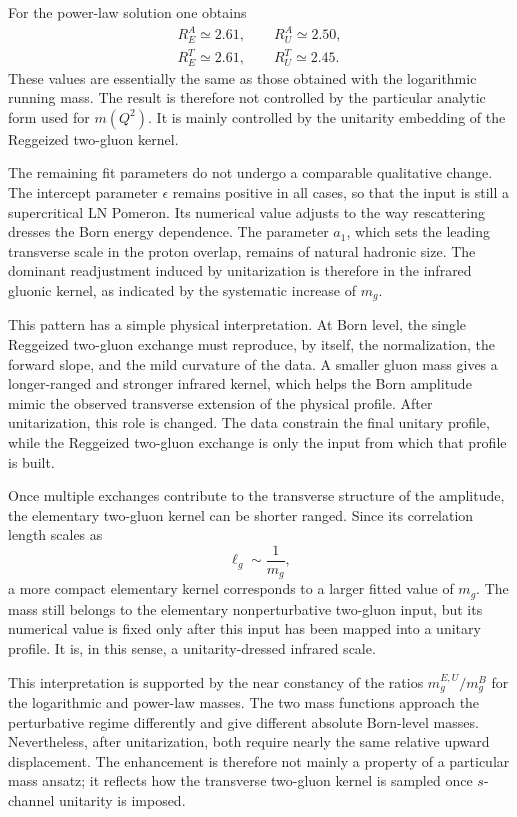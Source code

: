 \documentclass[aps,prd,twocolumn,superscriptaddress,longbibliography,nofootinbib]{revtex4-2}
\begin{document}
For the power-law solution one obtains
\begin{eqnarray}
R_E^A\simeq 2.61,
\qquad
R_U^A\simeq 2.50,\\
R_E^T\simeq 2.61,
\qquad
R_U^T\simeq 2.45.
\end{eqnarray}
These values are essentially the same as those obtained with the
logarithmic running mass. The result is therefore not controlled by the
particular analytic form used for $m(Q^2)$. It is mainly controlled by
the unitarity embedding of the Reggeized two-gluon kernel.



The remaining fit parameters do not undergo a comparable qualitative
change. The intercept parameter $\epsilon$ remains positive in all
cases, so that the input is still a supercritical LN Pomeron. Its
numerical value adjusts to the way rescattering dresses the Born energy
dependence. The parameter $a_1$, which sets the leading transverse scale
in the proton overlap, remains of natural hadronic size. The dominant
readjustment induced by unitarization is therefore in the infrared
gluonic kernel, as indicated by the systematic increase of $m_g$.

This pattern has a simple physical interpretation. At Born level, the
single Reggeized two-gluon exchange must reproduce, by itself, the
normalization, the forward slope, and the mild curvature of the data. A
smaller gluon mass gives a longer-ranged and stronger infrared kernel,
which helps the Born amplitude mimic the observed transverse extension
of the physical profile. After unitarization, this role is changed. The
data constrain the final unitary profile, while the Reggeized two-gluon
exchange is only the input from which that profile is built.

Once multiple exchanges contribute to the transverse structure of the
amplitude, the elementary two-gluon kernel can be shorter ranged. Since
its correlation length scales as
\begin{equation}
\ell_g\sim \frac{1}{m_g},
\label{eq:correlation_length}
\end{equation}
a more compact elementary kernel corresponds to a larger fitted value of
$m_g$. The mass still belongs to the elementary nonperturbative
two-gluon input, but its numerical value is fixed only after this input
has been mapped into a unitary profile. It is, in this sense, a
unitarity-dressed infrared scale.

This interpretation is supported by the near constancy of the ratios
$m_g^{E,U}/m_g^B$ for the logarithmic and power-law masses. The two mass
functions approach the perturbative regime differently and give
different absolute Born-level masses. Nevertheless, after unitarization,
both require nearly the same relative upward displacement. The
enhancement is therefore not mainly a property of a particular mass
ansatz; it reflects how the transverse two-gluon kernel is sampled once
$s$-channel unitarity is imposed.
\end{document}
